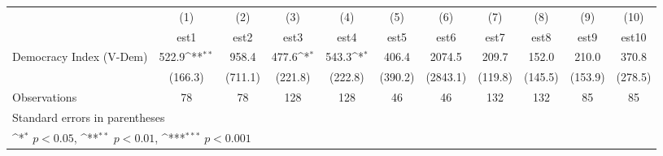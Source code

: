 {
\def\sym#1{\ifmmode^{#1}\else\(^{#1}\)\fi}
\begin{tabular}{l*{10}{c}}
\hline\hline
                    &\multicolumn{1}{c}{(1)}         &\multicolumn{1}{c}{(2)}         &\multicolumn{1}{c}{(3)}         &\multicolumn{1}{c}{(4)}         &\multicolumn{1}{c}{(5)}         &\multicolumn{1}{c}{(6)}         &\multicolumn{1}{c}{(7)}         &\multicolumn{1}{c}{(8)}         &\multicolumn{1}{c}{(9)}         &\multicolumn{1}{c}{(10)}         \\
                    &        est1         &        est2         &        est3         &        est4         &        est5         &        est6         &        est7         &        est8         &        est9         &       est10         \\
\hline
Democracy Index (V-Dem)&       522.9\sym{**} &       958.4         &       477.6\sym{*}  &       543.3\sym{*}  &       406.4         &      2074.5         &       209.7         &       152.0         &       210.0         &       370.8         \\
                    &     (166.3)         &     (711.1)         &     (221.8)         &     (222.8)         &     (390.2)         &    (2843.1)         &     (119.8)         &     (145.5)         &     (153.9)         &     (278.5)         \\
\hline
Observations        &          78         &          78         &         128         &         128         &          46         &          46         &         132         &         132         &          85         &          85         \\
\hline\hline
\multicolumn{11}{l}{\footnotesize Standard errors in parentheses}\\
\multicolumn{11}{l}{\footnotesize \sym{*} \(p<0.05\), \sym{**} \(p<0.01\), \sym{***} \(p<0.001\)}\\
\end{tabular}
}
